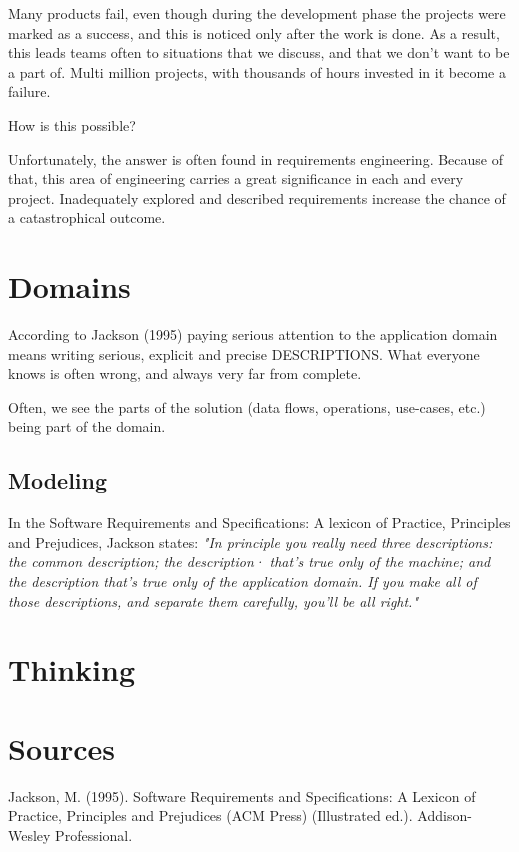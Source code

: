 \documentclass{article}
\begin{document}
Many products fail, even though during the development phase the projects were marked as a success, and this is noticed only after the work is done. As a result, this leads teams often to situations that we discuss, and that we don't want to be a part of. Multi million projects, with thousands of hours invested in it become a failure.

How is this possible?

Unfortunately, the answer is often found in requirements engineering. Because of that, this area of engineering carries a great significance in each and every project. Inadequately explored and described requirements increase the chance of a catastrophical outcome.



\section{Domains}
\label{sec:domains}

According to Jackson (1995) paying serious attention to the application domain means writing serious, explicit and precise DESCRIPTIONS. What everyone knows
is often wrong, and always very far from complete. 

Often, we see the parts of the solution (data flows, operations, use-cases, etc.) being part of the domain.

\subsection{Modeling}
In the Software Requirements and Specifications: A lexicon of Practice, Principles and Prejudices, Jackson states: 
\textit{"In principle you really need three descriptions: the common
description; the description· that's true only of the machine; and the
description that's true only of the application domain. If you make all of
those descriptions, and separate them carefully, you'll be all right."}


\section{Thinking}
\label{sec:thinking}



\section{Sources}
Jackson, M. (1995). Software Requirements and Specifications: A Lexicon of Practice, Principles and Prejudices (ACM Press) (Illustrated ed.). Addison-Wesley Professional.
\end{document}

